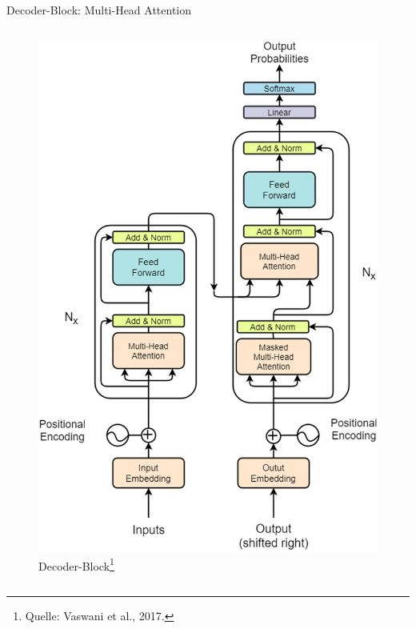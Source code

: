 \documentclass[aspectratio=1610, xcolor=dvipsnames, 9pt]{beamer}
\begin{document}
\begin{frame}{Decoder-Block: Multi-Head Attention}
\begin{columns}
\begin{column}{0.3\textwidth}
\begin{figure}
        \includegraphics[width=0.9\columnwidth]{images/Transformer-architecture-figure-sourced-from-original-paper-26.png}
        \caption{Decoder-Block\footnote{Quelle: Vaswani et al., 2017.}}
      \end{figure}
    \end{column}
  \end{columns}
\end{frame}
\end{document}
